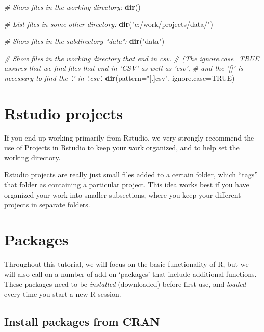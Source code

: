 \documentclass[]{book}
\newenvironment{Shaded}{\begin{snugshade}}{\end{snugshade}}
\newcommand{\CommentTok}[1]{\textcolor[rgb]{0.56,0.35,0.01}{\textit{#1}}}
\newcommand{\DataTypeTok}[1]{\textcolor[rgb]{0.13,0.29,0.53}{#1}}
\newcommand{\KeywordTok}[1]{\textcolor[rgb]{0.13,0.29,0.53}{\textbf{#1}}}
\newcommand{\NormalTok}[1]{#1}
\newcommand{\OtherTok}[1]{\textcolor[rgb]{0.56,0.35,0.01}{#1}}
\newcommand{\StringTok}[1]{\textcolor[rgb]{0.31,0.60,0.02}{#1}}
\begin{document}
\begin{Shaded}
\begin{Highlighting}[]
\CommentTok{# Show files in the working directory:}
\KeywordTok{dir}\NormalTok{()}

\CommentTok{# List files in some other directory:}
\KeywordTok{dir}\NormalTok{(}\StringTok{"c:/work/projects/data/"}\NormalTok{)}

\CommentTok{# Show files in the subdirectory "data":}
\KeywordTok{dir}\NormalTok{(}\StringTok{"data"}\NormalTok{)}

\CommentTok{# Show files in the working directory that end in csv.}
\CommentTok{# (The ignore.case=TRUE assures that we find files that end in 'CSV' as well as 'csv',}
\CommentTok{# and the '[]' is necessary to find the '.' in '.csv'.}
\KeywordTok{dir}\NormalTok{(}\DataTypeTok{pattern=}\StringTok{"[.]csv"}\NormalTok{, }\DataTypeTok{ignore.case=}\OtherTok{TRUE}\NormalTok{)}
\end{Highlighting}
\end{Shaded}

\hypertarget{rstudio-projects}{%
\section{Rstudio projects}\label{rstudio-projects}}

If you end up working primarily from Rstudio, we very strongly recommend the use of Projects in Rstudio to keep your work organized, and to help set the working directory.

Rstudio projects are really just small files added to a certain folder, which ``tags'' that folder as containing a particular project. This idea works best if you have organized your work into smaller subsections, where you keep your different projects in separate folders.

\hypertarget{packages}{%
\section{Packages}\label{packages}}

Throughout this tutorial, we will focus on the basic functionality of R, but we will also call on a number of add-on `packages' that include additional functions. These packages need to be \emph{installed} (downloaded) before first use, and \emph{loaded} every time you start a new R session.

\hypertarget{installpackage}{%
\subsection{Install packages from CRAN}\label{installpackage}}
\end{document}

